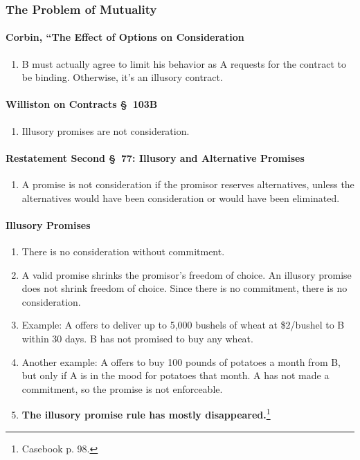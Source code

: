 \subsubsection{The Problem of Mutuality}

\paragraph{Corbin, ``The Effect of Options on Consideration}

\begin{enumerate}
    \item B must actually agree to limit his behavior as A requests for the 
    contract to be binding. Otherwise, it's an illusory contract.
\end{enumerate}

\paragraph{Williston on Contracts \S\ 103B}

\begin{enumerate}
    \item Illusory promises are not consideration.
\end{enumerate}

\paragraph{Restatement Second \S\ 77: Illusory and Alternative Promises}

\begin{enumerate}
    \item A promise is not consideration if the promisor reserves 
    alternatives, unless the alternatives would have been consideration or 
    would have been eliminated.
\end{enumerate}

\paragraph{Illusory Promises}

\begin{enumerate}
    \item There is no consideration without commitment.
    \item A valid promise shrinks the promisor's freedom of choice. An 
    illusory promise does not shrink freedom of choice. Since there is no 
    commitment, there is no consideration.
    \item Example: A offers to deliver up to 5,000 bushels of wheat at 
    \$2/bushel to B within 30 days. B has not promised to buy any wheat.
    \item Another example: A offers to buy 100 pounds of potatoes a month from 
    B, but only if A is in the mood for potatoes that month. A has not made a 
    commitment, so the promise is not enforceable.
    \item \textbf{The illusory promise rule has mostly 
    disappeared.}\footnote{Casebook p. 98.}
\end{enumerate}

